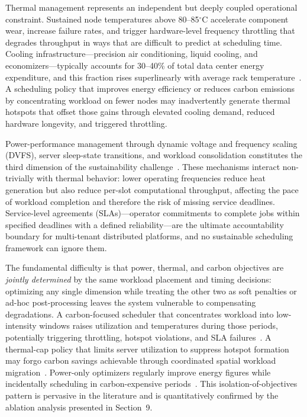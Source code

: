 \documentclass[a4paper,fleqn]{cas-dc}
\begin{document}
Thermal management represents an independent but deeply coupled operational constraint. Sustained node temperatures above 80--85$^{\circ}$C accelerate component wear, increase failure rates, and trigger hardware-level frequency throttling that degrades throughput in ways that are difficult to predict at scheduling time. Cooling infrastructure---precision air conditioning, liquid cooling, and economizers---typically accounts for 30--40\% of total data center energy expenditure, and this fraction rises superlinearly with average rack temperature~\cite{ref-nadjahi18,ref-banerjee11}. A scheduling policy that improves energy efficiency or reduces carbon emissions by concentrating workload on fewer nodes may inadvertently generate thermal hotspots that offset those gains through elevated cooling demand, reduced hardware longevity, and triggered throttling.

Power-performance management through dynamic voltage and frequency scaling (DVFS), server sleep-state transitions, and workload consolidation constitutes the third dimension of the sustainability challenge~\cite{ref-beloglazov-fgcs,ref-borghesi18,ref-kocot23,ref-li18}. These mechanisms interact non-trivially with thermal behavior: lower operating frequencies reduce heat generation but also reduce per-slot computational throughput, affecting the pace of workload completion and therefore the risk of missing service deadlines. Service-level agreements (SLAs)---operator commitments to complete jobs within specified deadlines with a defined reliability---are the ultimate accountability boundary for multi-tenant distributed platforms, and no sustainable scheduling framework can ignore them.

The fundamental difficulty is that power, thermal, and carbon objectives are \emph{jointly determined} by the same workload placement and timing decisions: optimizing any single dimension while treating the other two as soft penalties or ad-hoc post-processing leaves the system vulnerable to compensating degradations. A carbon-focused scheduler that concentrates workload into low-intensity windows raises utilization and temperatures during those periods, potentially triggering throttling, hotspot violations, and SLA failures~\cite{ref-radovanovic21,ref-hall24}. A thermal-cap policy that limits server utilization to suppress hotspot formation may forgo carbon savings achievable through coordinated spatial workload migration~\cite{ref-banerjee11,ref-sun14}. Power-only optimizers regularly improve energy figures while incidentally scheduling in carbon-expensive periods~\cite{ref-beloglazov-fgcs,ref-dorronsoro14}. This isolation-of-objectives pattern is pervasive in the literature and is quantitatively confirmed by the ablation analysis presented in Section~9.
\end{document}

